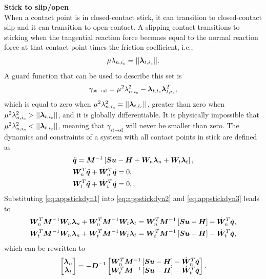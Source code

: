 \documentclass[../DC2017114Bouma.tex]{subfiles}
\begin{document}
\textbf{Stick to slip/open}\\
When a contact point is in closed-contact stick, it can transition to closed-contact slip and it can transition to open-contact. A slipping contact transitions to sticking when the tangential reaction force becomes equal to the normal reaction force at that contact point times the friction coefficient, i.e.,
\begin{align}
\mu\lambda_{n,i_c} = ||\boldsymbol{\lambda}_{t,i_c}||.
\end{align}
A guard function that can be used to describe this set is
\begin{align}
\gamma_{\text{st}\rightarrow\text{sl}} = \mu^2\lambda^2_{n,i_c} - \boldsymbol{\lambda}_{t,i_c}\boldsymbol{\lambda}_{t,i_c}^T,\label{eq:appguardstsl}
\end{align}
which is equal to zero when $\mu^2\lambda^2_{n,i_c} = ||\boldsymbol{\lambda}_{t,i_c}||$, greater than zero when $\mu^2\lambda^2_{n,i_c} > ||\boldsymbol{\lambda}_{t,i_c}||$, and it is globally differentiable. It is physically impossible that $\mu^2\lambda^2_{n,i_c} < ||\boldsymbol{\lambda}_{t,i_c}||$, meaning that $\gamma_{\text{st}\rightarrow\text{sl}}$ will never be smaller than zero. The dynamics and constraints of a system with all contact points in stick are defined as
\begin{align}
&\ddot{{\boldsymbol{q}}} = {\boldsymbol{M}}^{-1}\left[{\boldsymbol{S}}{\boldsymbol{u}} - {\boldsymbol{H}} + {\boldsymbol{W}}_{n}\boldsymbol{\lambda}_{n} + {\boldsymbol{W}}_{t}\boldsymbol{\lambda}_{t}\right],\label{eq:appstickdyn1}\\
&{\boldsymbol{W}}^T_{n}\ddot{{\boldsymbol{q}}} + \dot{{\boldsymbol{W}}}^T_{n}\dot{{\boldsymbol{q}}} = 0,\label{eq:appstickdyn2}\\
&{\boldsymbol{W}}^T_{t}\ddot{{\boldsymbol{q}}} + \dot{{\boldsymbol{W}}}^T_{t}\dot{{\boldsymbol{q}}} = 0,,\label{eq:appstickdyn3}
\end{align}
Substituting \eqref{eq:appstickdyn1} into \eqref{eq:appstickdyn2} and \eqref{eq:appstickdyn3} leads to
\begin{align}
{\boldsymbol{W}}_{n}^T{\boldsymbol{M}}^{-1}{\boldsymbol{W}}_{n}\boldsymbol{\lambda}_{n} + {\boldsymbol{W}}_{n}^T{\boldsymbol{M}}^{-1}{\boldsymbol{W}}_{t}\boldsymbol{\lambda}_{t} = {\boldsymbol{W}}_{n}^T{\boldsymbol{M}}^{-1}\left[{\boldsymbol{S}}{\boldsymbol{u}} - {\boldsymbol{H}}\right] -\dot{{\boldsymbol{W}}}^T_{n}\dot{{\boldsymbol{q}}}, \\
{\boldsymbol{W}}_{t}^T{\boldsymbol{M}}^{-1}{\boldsymbol{W}}_{n}\boldsymbol{\lambda}_{n} + {\boldsymbol{W}}_{t}^T{\boldsymbol{M}}^{-1}{\boldsymbol{W}}_{t}\boldsymbol{\lambda}_{t} = {\boldsymbol{W}}_{t}^T{\boldsymbol{M}}^{-1}\left[{\boldsymbol{S}}{\boldsymbol{u}} - {\boldsymbol{H}}\right] -\dot{{\boldsymbol{W}}}^T_{t}\dot{{\boldsymbol{q}}},
\end{align}
which can be rewritten to
\begin{align}
\begin{bmatrix}
\boldsymbol{\lambda}_{n}\\
\boldsymbol{\lambda}_{t}
\end{bmatrix} = - {\boldsymbol{D}}^{-1}\begin{bmatrix}
{\boldsymbol{W}}_{n}^T{\boldsymbol{M}}^{-1}\left[{\boldsymbol{S}}{\boldsymbol{u}} - {\boldsymbol{H}}\right] -\dot{{\boldsymbol{W}}}^T_{n}\dot{{\boldsymbol{q}}}\\
{\boldsymbol{W}}_{t}^T{\boldsymbol{M}}^{-1}\left[{\boldsymbol{S}}{\boldsymbol{u}} - {\boldsymbol{H}}\right] -\dot{{\boldsymbol{W}}}^T_{t}\dot{{\boldsymbol{q}}}
\end{bmatrix}.\label{eq:applambdastick}
\end{align}
\end{document}
